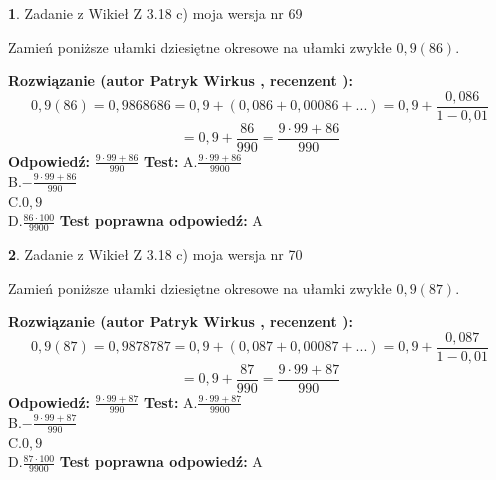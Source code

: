 \documentclass[12pt, a4paper]{article}
\theoremstyle{definition} %
\newtheorem{zad}{}
\newcommand{\zadStart}[1]{\begin{zad}#1\newline}
\newcommand{\zadStop}{\end{zad}}
\newcommand{\rozwStart}[2]{\noindent \textbf{Rozwiązanie (autor #1 , recenzent #2): }\newline}
\newcommand{\rozwStop}{\newline}
\newcommand{\odpStart}{\noindent \textbf{Odpowiedź:}\newline}
\newcommand{\odpStop}{\newline}
\newcommand{\testStart}{\noindent \textbf{Test:}\newline}
\newcommand{\testStop}{\newline}
\newcommand{\kluczStart}{\noindent \textbf{Test poprawna odpowiedź:}\newline}
\newcommand{\kluczStop}{\newline}
\begin{document}
\zadStart{Zadanie z Wikieł Z 3.18 c) moja wersja nr 69}

Zamień poniższe ułamki dziesiętne okresowe na ułamki zwykłe $0,9(86)$.
\zadStop
\rozwStart{Patryk Wirkus}{}
$$0,9(86)=0,9868686=0,9+(0,086+0,00086+...)=0,9+\frac{0,086}{1-0,01}$$
$$=0,9+\frac{86}{990}=\frac{9\cdot99+86}{990}$$
\rozwStop
\odpStart
$\frac{9\cdot99+86}{990}$
\odpStop
\testStart
A.$\frac{9\cdot99+86}{9900}$\\ B.$-\frac{9\cdot99+86}{990}$\\ C.$0,9$\\ D.$\frac{86\cdot100}{9900}$
\testStop
\kluczStart
A
\kluczStop



\zadStart{Zadanie z Wikieł Z 3.18 c) moja wersja nr 70}

Zamień poniższe ułamki dziesiętne okresowe na ułamki zwykłe $0,9(87)$.
\zadStop
\rozwStart{Patryk Wirkus}{}
$$0,9(87)=0,9878787=0,9+(0,087+0,00087+...)=0,9+\frac{0,087}{1-0,01}$$
$$=0,9+\frac{87}{990}=\frac{9\cdot99+87}{990}$$
\rozwStop
\odpStart
$\frac{9\cdot99+87}{990}$
\odpStop
\testStart
A.$\frac{9\cdot99+87}{9900}$\\ B.$-\frac{9\cdot99+87}{990}$\\ C.$0,9$\\ D.$\frac{87\cdot100}{9900}$
\testStop
\kluczStart
A
\kluczStop
\end{document}
